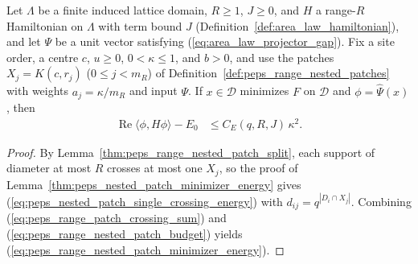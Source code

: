 \begin{lemma}
    \label{thm:peps_range_nested_patch_minimizer_energy}
    \leanok
    Let $\Lambda$ be a finite induced lattice domain, $R\ge1$, $J\ge0$, and
    $H$ a range-$R$ Hamiltonian on $\Lambda$ with term bound $J$ (Definition~\ref{def:area_law_hamiltonian}), and let $\Psi$ be a unit vector satisfying (\ref{eq:area_law_projector_gap}). Fix a site order, a centre $c$, $u\ge0$, $0<\kappa\le1$, and $b>0$, and use the patches $X_j=K(c,r_j)$ ($0\le j<m_R$) of Definition~\ref{def:peps_range_nested_patches} with weights $a_j=\kappa/m_R$ and input $\Psi$. If $x\in\mathcal D$ minimizes $F$ on $\mathcal D$ and $\phi=\widehat\Psi(x)$, then
    \begin{align}
        \operatorname{Re}\langle\phi,H\phi\rangle-E_0
         & \le C_E(q,R,J)\,\kappa^2.
        \label{eq:peps_range_nested_patch_minimizer_energy}
    \end{align}
\end{lemma}
\begin{proof}
    \leanok
    By Lemma~\ref{thm:peps_range_nested_patch_split}, each support of diameter at most $R$ crosses at most one $X_j$, so the proof of Lemma~\ref{thm:peps_nested_patch_minimizer_energy} gives (\ref{eq:peps_nested_patch_single_crossing_energy}) with $d_{ij}=q^{|D_i\cap X_j|}$. Combining (\ref{eq:peps_range_patch_crossing_sum}) and (\ref{eq:peps_range_nested_patch_budget}) yields (\ref{eq:peps_range_nested_patch_minimizer_energy}).
\end{proof}

